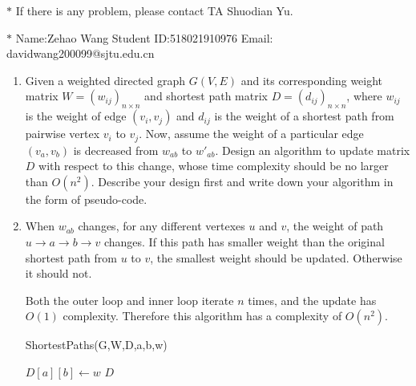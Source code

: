 \documentclass[12pt,a4paper]{article}
\makeatletter
\newtheorem*{solution}{Solution}
\theoremstyle{definition}
\renewenvironment{solution}[1][Solution] {\par\pushQED{\qed}\normalfont\topsep6\p@\@plus6\p@\relax\trivlist\item[\hskip\labelsep\bfseries#1\@addpunct{.}]\ignorespaces}{\popQED\endtrivlist\@endpefalse} \makeatother
\makeatother
\begin{document}
\noindent

\noindent{}
\begin{center}
\footnotesize{\color{red}$*$ If there is any problem, please contact TA Shuodian Yu. }

\footnotesize{\color{blue}$*$ Name:Zehao Wang  \quad Student ID:518021910976 \quad Email: davidwang200099@sjtu.edu.cn}
\end{center}
\begin{enumerate}
\item Given a weighted directed graph $G(V, E)$ and its corresponding weight matrix $W=(w_{ij})_{n \times n}$ and shortest path matrix $D=(d_{ij})_{n \times n}$, where $w_{ij}$ is the weight of edge $(v_i, v_j)$ and $d_{ij}$ is the weight of a shortest path from pairwise vertex $v_i$ to $v_j$. Now, assume the weight of a particular edge $(v_a, v_b)$ is decreased from $w_{ab}$ to $w'_{ab}$. Design an algorithm to update matrix $D$ with respect to this change, whose time complexity should be no larger than $O(n^2)$. Describe your design first and write down your algorithm in the form of pseudo-code.
    \begin{solution}
        When $w_{ab}$ changes, for any different vertexes $u$ and $v$, the weight of path $u\rightarrow a \rightarrow b \rightarrow v$ changes. If this path has smaller weight than the original shortest path from $u$ to $v$, the smallest weight should be updated. Otherwise it should not.
        
        Both the outer loop and inner loop iterate $n$ times, and the update has $O(1)$ complexity. Therefore this algorithm has a complexity of $O(n^2)$.
        
        \begin{minipage}[t]{0.85\textwidth}
        	\begin{algorithm}[H]
        		\BlankLine
        		\caption{ShortestPaths(G,W,D,a,b,w)}
        		\label{Alg-1}
        		$D[a][b] \leftarrow w$\;
        		\Return $D$\;
        	\end{algorithm}
        \end{minipage}
    \end{solution}


\end{enumerate}
\end{document}
